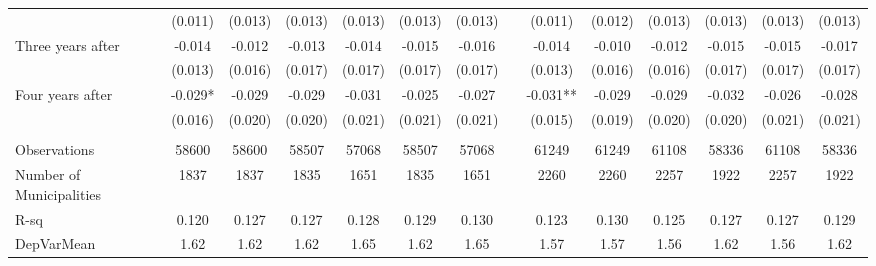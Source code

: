 \begin{tabular}{lccccccccccccc}
      & (0.011) & (0.013) & (0.013) & (0.013) & (0.013) & (0.013) &       & (0.011) & (0.012) & (0.013) & (0.013) & (0.013) & (0.013) \\
Three years after & -0.014 & -0.012 & -0.013 & -0.014 & -0.015 & -0.016 &       & -0.014 & -0.010 & -0.012 & -0.015 & -0.015 & -0.017 \\
      & (0.013) & (0.016) & (0.017) & (0.017) & (0.017) & (0.017) &       & (0.013) & (0.016) & (0.016) & (0.017) & (0.017) & (0.017) \\
Four years after & -0.029* & -0.029 & -0.029 & -0.031 & -0.025 & -0.027 &       & -0.031** & -0.029 & -0.029 & -0.032 & -0.026 & -0.028 \\
      & (0.016) & (0.020) & (0.020) & (0.021) & (0.021) & (0.021) &       & (0.015) & (0.019) & (0.020) & (0.020) & (0.021) & (0.021) \\
      &       &       &       &       &       &       &       &       &       &       &       &       &  \\
\midrule
Observations & 58600 & 58600 & 58507 & 57068 & 58507 & 57068 &       & 61249 & 61249 & 61108 & 58336 & 61108 & 58336 \\
Number of Municipalities & 1837  & 1837  & 1835  & 1651  & 1835  & 1651  &       & 2260  & 2260  & 2257  & 1922  & 2257  & 1922 \\
R-sq  & 0.120 & 0.127 & 0.127 & 0.128 & 0.129 & 0.130 &       & 0.123 & 0.130 & 0.125 & 0.127 & 0.127 & 0.129 \\
DepVarMean & 1.62  & 1.62  & 1.62  & 1.65  & 1.62  & 1.65  &       & 1.57  & 1.57  & 1.56  & 1.62  & 1.56  & 1.62 \\
\bottomrule
\bottomrule
\end{tabular}%
